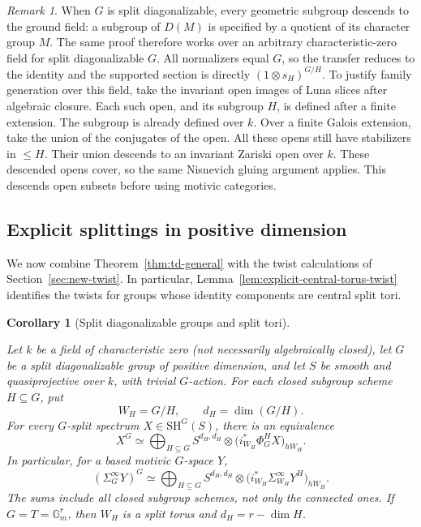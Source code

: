 \documentclass[11pt,reqno]{amsart}
\newtheorem{corollary}[theorem]{Corollary}
\theoremstyle{definition}
\theoremstyle{remark}
\newtheorem{remark}[theorem]{Remark}
\theoremstyle{plain}
\numberwithin{equation}{section}
\newcommand{\SH}{\mathrm{SH}}
\newcommand{\Gm}{\mathbb G_m}
\begin{document}
\begin{remark}
When \(G\) is split diagonalizable, every geometric subgroup descends
to the ground field: a subgroup of \(D(M)\) is specified by a quotient
of its character group \(M\). The same proof therefore works over
an arbitrary characteristic-zero field for split diagonalizable
\(G\). All normalizers equal \(G\), so the transfer reduces to
the identity and the supported section is directly
\((1\otimes s_H)^{G/H}\).
To justify family generation over this field, take the invariant open
images of Luna slices after algebraic closure.
Each such open, and its subgroup \(H\), is defined after a finite
extension. The subgroup is already defined over \(k\).
Over a finite Galois extension, take the union of the conjugates of
the open. All these opens still have stabilizers in \(\le H\).
Their union descends to an invariant Zariski open over \(k\).
These descended opens cover, so the same Nisnevich gluing argument
applies. This descends open subsets before using motivic categories.
\end{remark}


\subsection{Explicit splittings in positive dimension}

We now combine Theorem~\ref{thm:td-general} with the twist
calculations of Section~\ref{sec:new-twist}.
In particular,
Lemma~\ref{lem:explicit-central-torus-twist} identifies
the twists for groups whose identity components are
central split tori.

\begin{corollary}[Split diagonalizable groups and split tori]
\label{cor:explicit-diagonalizable-splitting}

Let \(k\) be a field of characteristic zero (not necessarily algebraically closed), 
let \(G\) be a split diagonalizable group of positive dimension, and let
\(S\) be smooth and quasiprojective over \(k\), with trivial
\(G\)-action. For each closed subgroup scheme \(H\subseteq G\),
put
\[
 W_H=G/H,\qquad d_H=\dim(G/H).
\]
For every \(G\)-split spectrum \(X\in\SH^G(S)\), there is
an equivalence
\[
 X^G\simeq
 \bigoplus_{H\subseteq G}
 S^{d_H,d_H}\otimes
 \bigl(i_{W_H}^*\Phi_G^H X\bigr)_{hW_H}.
\]
In particular, for a based motivic \(G\)-space \(Y\),
\[
 (\Sigma_G^\infty Y)^G\simeq
 \bigoplus_{H\subseteq G}
 S^{d_H,d_H}\otimes
 \bigl(i_{W_H}^*\Sigma_{W_H}^\infty Y^H\bigr)_{hW_H}.
\]
The sums include all closed subgroup schemes, not only the
connected ones. If \(G=T=\Gm^r\), then \(W_H\) is a split
torus and \(d_H=r-\dim H\).
\end{corollary}
\end{document}
